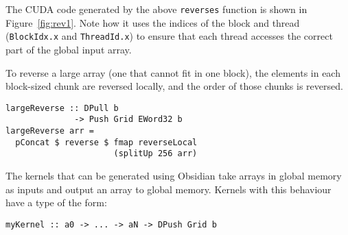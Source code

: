 The CUDA code generated by the above \verb!reverses! function is shown in 
Figure~\ref{fig:rev1}. Note how it uses the indices of the block 
and thread (\verb!BlockIdx.x! and \verb!ThreadId.x!)
to ensure that each thread accesses the correct part of
the global input array.







To reverse a large array (one that cannot fit in one block), the elements
in each block-sized chunk are reversed locally, and the order of those chunks is reversed.


\begin{small} 
\begin{verbatim} 
largeReverse :: DPull b
              -> Push Grid EWord32 b
largeReverse arr =
  pConcat $ reverse $ fmap reverseLocal
                      (splitUp 256 arr) 
\end{verbatim} 
\end{small} 

The kernels that can be generated using Obsidian take arrays 
in global memory as inputs and output an array to global memory. 
Kernels with this behaviour have a type of the form: 

\begin{small} 
\begin{Verbatim}[samepage=true]
myKernel :: a0 -> ... -> aN -> DPush Grid b 
\end{Verbatim} 
\end{small} 

